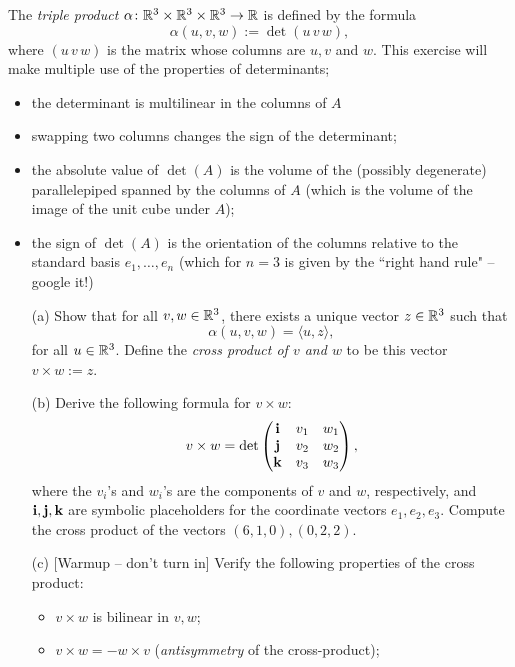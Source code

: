 \documentclass[a4paper, 12pt]{article}
\begin{document}
\begin{problem} 
The {\em triple product} $\alpha\colon \mathbb{R}^3\times\mathbb{R}^3\times\mathbb{R}^3\to \mathbb{R}$ is defined by the formula
\[\alpha(u,v,w) := \det( u \, v \, w),
\]
where $(u\,  v\,  w)$ is the matrix whose columns are $u, v$ and $w$.   This exercise  will make multiple use of the properties of determinants;
\begin{itemize}
    \item the determinant is multilinear in the columns of $A$
    \item swapping two columns changes the sign of the determinant;
    \item the absolute value of $\det(A)$  is the volume of the (possibly degenerate) parallelepiped spanned by the columns of $A$  (which is the volume of the image of the unit cube under $A$);
    \item the sign of $\det(A)$  is the orientation of the columns relative to the standard basis $e_1, \ldots, e_n$ (which for $n=3$ is given by the ``right hand rule" -- google it!)
\end{itemize}
\begin{enumerate}
    \item[(a)]  Show that for all $v,w\in \mathbb{R}^3$, there exists a unique vector $z\in\mathbb{R}^3$ such that
        \[\alpha(u,v,w) = \langle u, z \rangle,
        \]
        for all $u\in \mathbb{R}^3$.  Define the {\em cross product of $v$ and $w$} to be this vector $v\times w:= z$.
    \item[(b)] Derive the following formula for $v\times w$:
        \[v\times w = \det \begin{pmatrix} {\bf i} & v_1 & w_1 \\
                {\bf j} & v_2 & w_2 \\
                {\bf k} & v_3 & w_3 \\
            \end{pmatrix},
        \]
        where the $v_i$'s and $w_i$'s are the components of $v$ and $w$, respectively, and ${\bf i}, {\bf j}, {\bf k}$ are symbolic placeholders for the coordinate vectors $e_1, e_2,e_3$.
        Compute the cross product of the vectors $(6,1,0), (0,2,2)$.
    \item[(c)] [Warmup -- don't turn in] Verify the following properties of the cross product:
        \begin{itemize}
            \item $v\times w$ is bilinear in $v,w$;
            \item $v\times w = -w\times v$ ({\em antisymmetry} of the cross-product);

\end{itemize}
\end{enumerate}
\end{problem}
\end{document}
